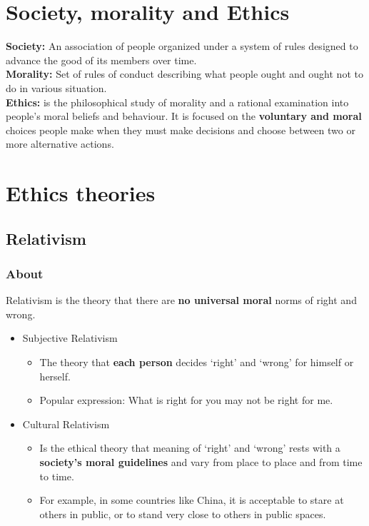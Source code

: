 \documentclass{article}
\begin{document}
\tableofcontents

\newpage

\section{Society, morality and Ethics}
\begin{flushleft}
\textbf{Society:} An association of people organized under a system of rules designed to advance the good of its members over time.\\ \textbf{Morality:} Set of rules of conduct describing what people ought and ought not to do in various situation.\\
\textbf{Ethics:} is the philosophical study of morality and a rational examination into people’s moral beliefs and behaviour. It is focused on the \textbf{voluntary and moral} choices people make when they must make decisions and choose between two or more alternative actions.
\end{flushleft}

\section{Ethics theories}

\subsection{Relativism}
\subsubsection{About}
\begin{flushleft}
Relativism is the theory that there are \textbf{no universal moral} norms of right and wrong. 
\end{flushleft}
\begin{itemize}
  \item Subjective Relativism
  \begin{itemize}
    \item The theory that \textbf{each person} decides ‘right’ and ‘wrong’ for himself or herself.
    \item Popular expression: What is right for you may not be right for me.
  \end{itemize}
  \item Cultural Relativism 
  \begin{itemize}
    \item Is the ethical theory that meaning of ‘right’ and ‘wrong’ rests with a \textbf{society’s moral guidelines} and vary from place to place and from time to time.
    \item For example, in some countries like China, it is acceptable to stare at others in public, or to stand very close to others in public spaces.
  \end{itemize}
\end{itemize}
\end{document}
